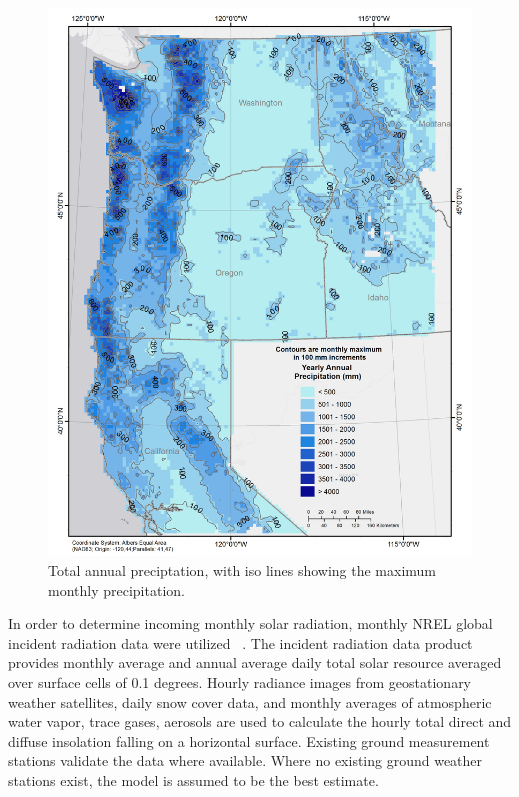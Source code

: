 \documentclass[preprint,12pt]{elsarticle}
\begin{document}
\begin{figure}[hp]
  \centering  
  \includegraphics[width=1.0\linewidth]{precip}  
\caption{Total annual preciptation, with iso lines showing the maximum monthly precipitation.}
  \label{fig:precip}
\end{figure}

In order to determine incoming monthly solar radiation, monthly
\acf{NREL} global incident radiation data were
utilized ~\cite{Perez2002}.  The incident radiation data product
provides monthly average and annual average daily total solar resource
averaged over surface cells of 0.1 degrees.  Hourly radiance images
from geostationary weather satellites, daily snow cover data, and
monthly averages of atmospheric water vapor, trace gases, aerosols are
used to calculate the hourly total direct and diffuse insolation
falling on a horizontal surface.  Existing ground measurement stations
validate the data where available. Where no existing ground weather
stations exist, the model is assumed to be the best estimate.
\end{document}
